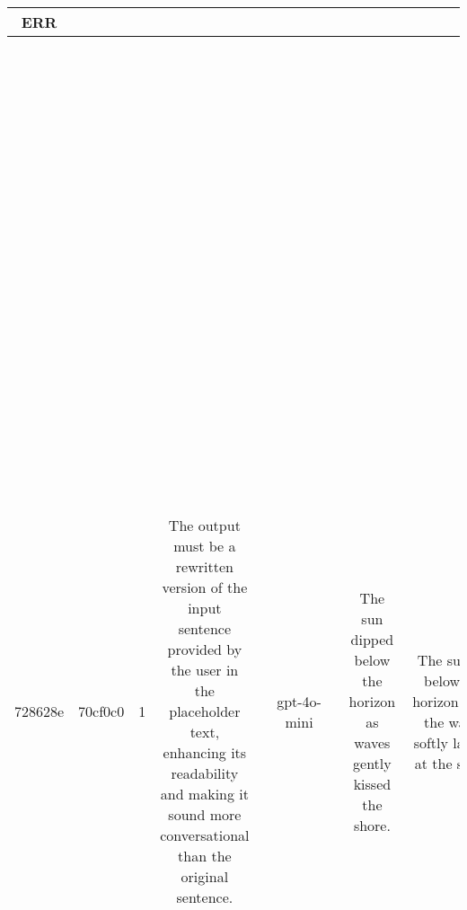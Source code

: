 \begin{table}[h!]
\begin{tabular}{|c|c|c|c|c|c|c|c|c|c|}
ERR & \\
\hline
728628e & 70cf0c0 & 1 & The output must be a rewritten version of the input sentence provided by the user in the placeholder {{text}}, enhancing its readability and making it sound more conversational than the original sentence. & gpt-4o-mini & The sun dipped below the horizon as waves gently kissed the shore. & The sun set below the horizon while the waves softly lapped at the shore. & ok & The output provided by the chatbot is a sentence that appears to be rewritten for better readability and a more conversational tone. It uses simple and relatable language and forms a fluid and engaging structure. The presence of 'softly lapped at the shore' is an example of engaging, relatable language. There seems to be no complex phrasing in the sentence, and it maintains a clear narrative. Since evaluating factual accuracy or the preservation of original meaning requires the original input, this part of the compliance is not considered here. Based on elements that can be assessed without the input, the output is consistent with the chatbot's instructions. 

No violation.
OK & \\
\hline
728628e & 70cf0c0 & 1 & The output must be a rewritten version of the input sentence provided by the user in the placeholder {{text}}, enhancing its readability and making it sound more conversational than the original sentence. & gemma2:9b & The sun dipped below the horizon as waves gently kissed the shore. & Here's a more conversational rewrite:

**Original:**  The sun dipped below the horizon as waves gently kissed the shore. 

**Revised:** As the sun went down, the waves softly lapped at the beach. 


Let me know if you want to try another sentence! 😊  
 & ok & The output appears to be a rewritten sentence, where the original sentence has been modified to make it sound more conversational while preserving its meaning. The phrase "The sun dipped below the horizon" has been changed to "As the sun went down," which simplifies the wording. The phrase "waves gently kissed the shore" has been changed to "the waves softly lapped at the beach," maintaining factual accuracy and enhancing readability. Additionally, the output includes a friendly offer to assist further, adding to an engaging structure. Therefore, based on the provided guidelines, there is no violation of the chatbot's description.


\end{tabular}
\end{table}

